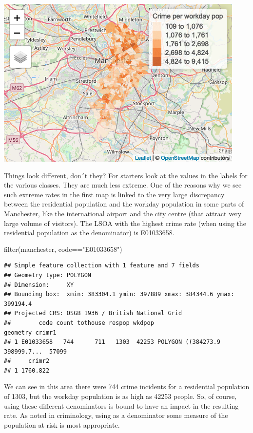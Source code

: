 \documentclass[
]{book}
\makeatletter
\newenvironment{Shaded}{\begin{snugshade}}{\end{snugshade}}
\newcommand{\FunctionTok}[1]{\textcolor[rgb]{0,0,0}{#1}}
\newcommand{\NormalTok}[1]{#1}
\newcommand{\SpecialCharTok}[1]{\textcolor[rgb]{0,0,0}{#1}}
\newcommand{\StringTok}[1]{\textcolor[rgb]{0.5,0.5,0.5}{#1}}
\newenvironment{kframe}{%
\medskip{}
\setlength{\fboxsep}{.8em}
 \def\at@end@of@kframe{}%
 \ifinner\ifhmode%
  \def\at@end@of@kframe{\end{minipage}}%
  \begin{minipage}{\columnwidth}%
 \fi\fi%
 \def\FrameCommand##1{\hskip\@totalleftmargin \hskip-\fboxsep
 \colorbox{shadecolor}{##1}\hskip-\fboxsep
     \hskip-\linewidth \hskip-\@totalleftmargin \hskip\columnwidth}%
 \MakeFramed {\advance\hsize-\width
   \@totalleftmargin\z@ \linewidth\hsize
   \@setminipage}}%
 {\par\unskip\endMakeFramed%
 \at@end@of@kframe}
\renewenvironment{Shaded}{\begin{kframe}}{\end{kframe}}
\makeatother
\begin{document}
\includegraphics{crime_mapping_files/figure-latex/unnamed-chunk-104-1.png}

Things look different, don´t they? For starters look at the values in the labels for the various classes. They are much less extreme. One of the reasons why we see such extreme rates in the first map is linked to the very large discrepancy between the residential population and the workday population in some parts of Manchester, like the international airport and the city centre (that attract very large volume of visitors). The LSOA with the highest crime rate (when using the residential population as the denominator) is E01033658.

\begin{Shaded}
\begin{Highlighting}[]
\FunctionTok{filter}\NormalTok{(manchester, code}\SpecialCharTok{==}\StringTok{"E01033658"}\NormalTok{)}
\end{Highlighting}
\end{Shaded}

\begin{verbatim}
## Simple feature collection with 1 feature and 7 fields
## Geometry type: POLYGON
## Dimension:     XY
## Bounding box:  xmin: 383304.1 ymin: 397889 xmax: 384344.6 ymax: 399194.4
## Projected CRS: OSGB 1936 / British National Grid
##        code count tothouse respop wkdpop                       geometry crimr1
## 1 E01033658   744      711   1303  42253 POLYGON ((384273.9 398999.7...  57099
##     crimr2
## 1 1760.822
\end{verbatim}

We can see in this area there were 744 crime incidents for a residential population of 1303, but the workday population is as high as 42253 people. So, of course, using these different denominators is bound to have an impact in the resulting rate. As noted in criminology, using as a denominator some measure of the population at risk is most appropriate.
\end{document}
